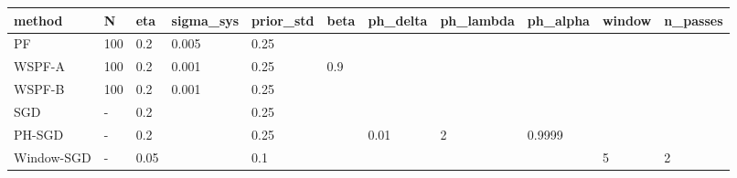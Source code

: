 \begin{tabular}{lllllllllll}
\hline
method & N & eta & sigma\_sys & prior\_std & beta & ph\_delta & ph\_lambda & ph\_alpha & window & n\_passes \\
\hline
PF & 100 & 0.2 & 0.005 & 0.25 &  &  &  &  &  &  \\
WSPF-A & 100 & 0.2 & 0.001 & 0.25 & 0.9 &  &  &  &  &  \\
WSPF-B & 100 & 0.2 & 0.001 & 0.25 &  &  &  &  &  &  \\
SGD & - & 0.2 &  & 0.25 &  &  &  &  &  &  \\
PH-SGD & - & 0.2 &  & 0.25 &  & 0.01 & 2 & 0.9999 &  &  \\
Window-SGD & - & 0.05 &  & 0.1 &  &  &  &  & 5 & 2 \\
\hline
\end{tabular}
